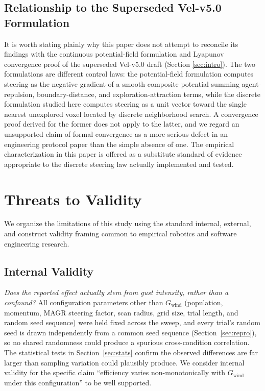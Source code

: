 \documentclass[10pt,journal]{IEEEtran}
\begin{document}
\subsection{Relationship to the Superseded Vel-v5.0 Formulation}
It is worth stating plainly why this paper does not attempt to reconcile
its findings with the continuous potential-field formulation and Lyapunov
convergence proof of the superseded Vel-v5.0 draft (Section
\ref{sec:intro}). The two formulations are different control laws: the
potential-field formulation computes steering as the negative gradient of
a smooth composite potential summing agent-repulsion, boundary-distance,
and exploration-attraction terms, while the discrete formulation studied
here computes steering as a unit vector toward the single nearest
unexplored voxel located by discrete neighborhood search. A convergence
proof derived for the former does not apply to the latter, and we regard
an unsupported claim of formal convergence as a more serious defect in an
engineering protocol paper than the simple absence of one. The empirical
characterization in this paper is offered as a substitute standard of
evidence appropriate to the discrete steering law actually implemented and
tested.

\section{Threats to Validity}
\label{sec:limits}

We organize the limitations of this study using the standard internal,
external, and construct validity framing common to empirical robotics and
software engineering research.

\subsection{Internal Validity}
\textit{Does the reported effect actually stem from gust intensity, rather
than a confound?} All configuration parameters other than
$G_{\text{wind}}$ (population, momentum, MAGR steering factor, scan radius,
grid size, trial length, and random seed sequence) were held fixed across
the sweep, and every trial's random seed is drawn independently from a
common seed sequence (Section~\ref{sec:repro}), so no shared randomness
could produce a spurious cross-condition correlation. The statistical
tests in Section~\ref{sec:stats} confirm the observed differences are
far larger than sampling variation could plausibly produce. We consider
internal validity for the specific claim ``efficiency varies
non-monotonically with $G_{\text{wind}}$ under this configuration'' to be
well supported.
\end{document}
